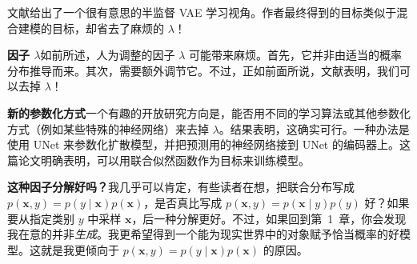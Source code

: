 文献给出了一个很有意思的半监督 VAE 学习视角。作者最终得到的目标类似于混合建模的目标，却省去了麻烦的 $\lambda$！

\noindent\textbf{因子 $\lambda$}\quad 如前所述，人为调整的因子 $\lambda$ 可能带来麻烦。首先，它并非由适当的概率分布推导而来。其次，需要额外调节它。不过，正如前面所说，文献表明，我们可以去掉 $\lambda$！

\noindent\textbf{新的参数化方式}\quad 一个有趣的开放研究方向是，能否用不同的学习算法或其他参数化方式（例如某些特殊的神经网络）来去掉 $\lambda$。结果表明，这确实可行。一种办法是使用 UNet 来参数化扩散模型，并把预测用的神经网络接到 UNet 的编码器上。这篇论文明确表明，可以用联合似然函数作为目标来训练模型。

\noindent\textbf{这种因子分解好吗？}\quad 我几乎可以肯定，有些读者在想，把联合分布写成 $p(\mathbf{x},y)=p(y\mid\mathbf{x})p(\mathbf{x})$，是否真比写成 $p(\mathbf{x},y)=p(\mathbf{x}\mid y)p(y)$ 好？如果要从指定类别 $y$ 中采样 $\mathbf{x}$，后一种分解更好。不过，如果回到第~1~章，你会发现我在意的并非\emph{生成}。我更希望得到一个能为现实世界中的对象赋予恰当概率的好模型。这就是我更倾向于 $p(\mathbf{x},y)=p(y\mid\mathbf{x})p(\mathbf{x})$ 的原因。

\FloatBarrier

